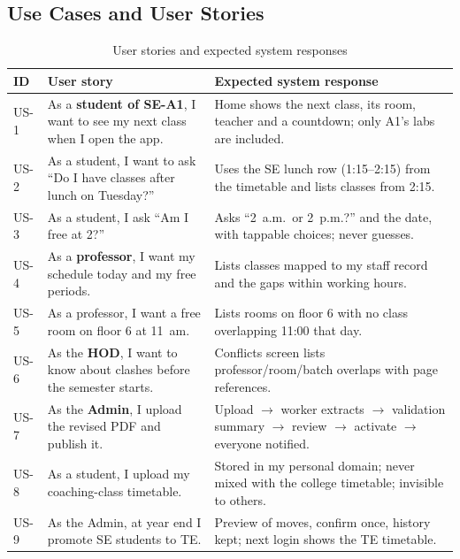 \subsection{Use Cases and User Stories}
\begin{table}[H]
\centering
\caption{User stories and expected system responses}
\label{tab:stories}
\small
\begin{tabularx}{\textwidth}{@{}p{1cm}p{6.4cm}X@{}}
\toprule
\textbf{ID} & \textbf{User story} & \textbf{Expected system response}\\
\midrule
US-1 & As a \textbf{student of SE-A1}, I want to see my next class when I open the app. & Home shows the next class, its room, teacher and a countdown; only A1's labs are included.\\
US-2 & As a student, I want to ask ``Do I have classes after lunch on Tuesday?'' & Uses the SE lunch row (1:15--2:15) from the timetable and lists classes from 2:15.\\
US-3 & As a student, I ask ``Am I free at 2?'' & Asks ``2~a.m.\ or 2~p.m.?'' and the date, with tappable choices; never guesses.\\
US-4 & As a \textbf{professor}, I want my schedule today and my free periods. & Lists classes mapped to my staff record and the gaps within working hours.\\
US-5 & As a professor, I want a free room on floor 6 at 11~am. & Lists rooms on floor 6 with no class overlapping 11:00 that day.\\
US-6 & As the \textbf{HOD}, I want to know about clashes before the semester starts. & Conflicts screen lists professor/room/batch overlaps with page references.\\
US-7 & As the \textbf{Admin}, I upload the revised PDF and publish it. & Upload $\rightarrow$ worker extracts $\rightarrow$ validation summary $\rightarrow$ review $\rightarrow$ activate $\rightarrow$ everyone notified.\\
US-8 & As a student, I upload my coaching-class timetable. & Stored in my personal domain; never mixed with the college timetable; invisible to others.\\
US-9 & As the Admin, at year end I promote SE students to TE. & Preview of moves, confirm once, history kept; next login shows the TE timetable.\\
\bottomrule
\end{tabularx}
\end{table}

\newpage
